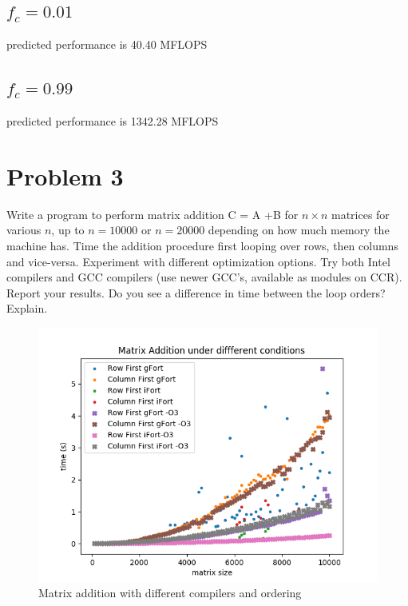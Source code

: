 \documentclass[12pt]{article}
\theoremstyle{plain}
\theoremstyle{definition}
\begin{document}
\subsection{$f_c = 0.01$}
predicted performance is 40.40 MFLOPS
\subsection{$f_c = 0.99$}
predicted performance is 1342.28 MFLOPS

\section*{Problem 3}
Write a program to perform matrix addition C = A +B for $n \times n$ matrices for various $n$,
up to $n = 10000$ or $n = 20000$ depending on how much memory the machine has. Time
the addition procedure first looping over rows, then columns and vice-versa. Experiment
with different optimization options. Try both Intel compilers and GCC compilers (use
newer GCC’s, available as modules on CCR). Report your results. Do you see a difference
in time between the loop orders? Explain.

\begin{figure}
\label{fig:problem3}
\includegraphics[scale=0.7]{problem3.png}
\caption{Matrix addition with different compilers and ordering}
\end{figure}
\end{document}
